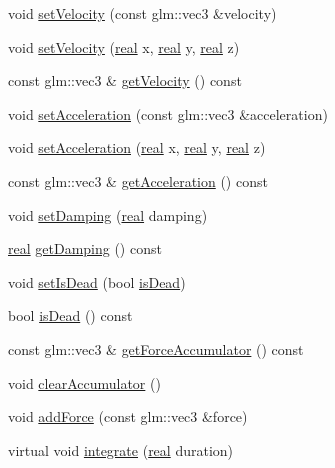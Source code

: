 \begin{DoxyCompactItemize}
\item 
void \mbox{\hyperlink{classr3_1_1_particle_ae0e84b5875dcf2dc6850ba8698f8f936}{set\+Velocity}} (const glm\+::vec3 \&velocity)
\item 
void \mbox{\hyperlink{classr3_1_1_particle_afe7217976e22ed36892d8f7df4ea68d2}{set\+Velocity}} (\mbox{\hyperlink{namespacer3_ab2016b3e3f743fb735afce242f0dc1eb}{real}} x, \mbox{\hyperlink{namespacer3_ab2016b3e3f743fb735afce242f0dc1eb}{real}} y, \mbox{\hyperlink{namespacer3_ab2016b3e3f743fb735afce242f0dc1eb}{real}} z)
\item 
const glm\+::vec3 \& \mbox{\hyperlink{classr3_1_1_particle_ad62513767465d21c328b4296aa9720ff}{get\+Velocity}} () const
\item 
void \mbox{\hyperlink{classr3_1_1_particle_ad4c180ad74ee8cfd1b0e5c76347d6182}{set\+Acceleration}} (const glm\+::vec3 \&acceleration)
\item 
void \mbox{\hyperlink{classr3_1_1_particle_a4043de464de32d14d8db0f676f63da75}{set\+Acceleration}} (\mbox{\hyperlink{namespacer3_ab2016b3e3f743fb735afce242f0dc1eb}{real}} x, \mbox{\hyperlink{namespacer3_ab2016b3e3f743fb735afce242f0dc1eb}{real}} y, \mbox{\hyperlink{namespacer3_ab2016b3e3f743fb735afce242f0dc1eb}{real}} z)
\item 
const glm\+::vec3 \& \mbox{\hyperlink{classr3_1_1_particle_ab97ffa1b19d4fda5ea49b67531d0300d}{get\+Acceleration}} () const
\item 
void \mbox{\hyperlink{classr3_1_1_particle_a5a7d9ff7821fd5755317ec877f66e8f6}{set\+Damping}} (\mbox{\hyperlink{namespacer3_ab2016b3e3f743fb735afce242f0dc1eb}{real}} damping)
\item 
\mbox{\hyperlink{namespacer3_ab2016b3e3f743fb735afce242f0dc1eb}{real}} \mbox{\hyperlink{classr3_1_1_particle_a6f05d81870e5566701760873082ae1b0}{get\+Damping}} () const
\item 
void \mbox{\hyperlink{classr3_1_1_particle_a1f0b0ac6f094025e02359026c681350f}{set\+Is\+Dead}} (bool \mbox{\hyperlink{classr3_1_1_particle_aeeb9dd636d0851bc007ff718ef9140e9}{is\+Dead}})
\item 
bool \mbox{\hyperlink{classr3_1_1_particle_aeeb9dd636d0851bc007ff718ef9140e9}{is\+Dead}} () const
\item 
const glm\+::vec3 \& \mbox{\hyperlink{classr3_1_1_particle_a81fe0cfac976df7da6337dabc8f73313}{get\+Force\+Accumulator}} () const
\item 
void \mbox{\hyperlink{classr3_1_1_particle_a1ba9a33fb4513cf79eb8bf4954ec6b97}{clear\+Accumulator}} ()
\item 
void \mbox{\hyperlink{classr3_1_1_particle_a18bc9d9ded382879086eb2820ce787c9}{add\+Force}} (const glm\+::vec3 \&force)
\item 
virtual void \mbox{\hyperlink{classr3_1_1_particle_aff134984d9bc7409579e16eca3e42b68}{integrate}} (\mbox{\hyperlink{namespacer3_ab2016b3e3f743fb735afce242f0dc1eb}{real}} duration)
\end{DoxyCompactItemize}
